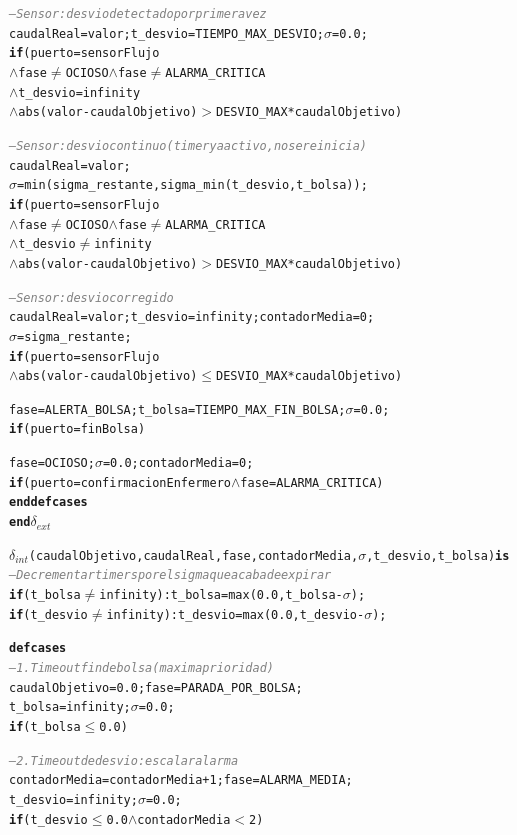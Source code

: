 \documentclass[12pt, a4paper]{article}
\newcommand{\cmlgt}{$>$}
\newcommand{\cmlle}{$\leq$}
\newcommand{\cmllt}{$<$}
\newcommand{\cmlwedge}{$\wedge$}
\newcommand{\cmlneq}{$\neq$}
\newcommand{\kw}[1]{\textbf{#1}}
\newcommand{\cmlsigma}{$\sigma$}
\newcommand{\dint}{$\delta_{\mathit{int}}$}
\newcommand{\dext}{$\delta_{\mathit{ext}}$}
\newcommand{\cmlcomment}[1]{\textit{\textcolor{gray}{#1}}}
\newenvironment{cmldevs}{%
  \begin{alltt}\small%
}{%
  \end{alltt}%
}
\begin{document}
\begin{center}
\begin{cmldevs}
        \cmlcomment{-- Sensor: desvio detectado por primera vez}
        caudalReal = valor; t\_desvio = TIEMPO\_MAX\_DESVIO; \cmlsigma{} = 0.0;
            \kw{if} (puerto = sensorFlujo
                \cmlwedge{} fase \cmlneq{} OCIOSO \cmlwedge{} fase \cmlneq{} ALARMA\_CRITICA
                \cmlwedge{} t\_desvio = infinity
                \cmlwedge{} abs(valor - caudalObjetivo) \cmlgt{} DESVIO\_MAX * caudalObjetivo)

        \cmlcomment{-- Sensor: desvio continuo (timer ya activo, no se reinicia)}
        caudalReal = valor;
        \cmlsigma{} = min(sigma\_restante, sigma\_min(t\_desvio, t\_bolsa));
            \kw{if} (puerto = sensorFlujo
                \cmlwedge{} fase \cmlneq{} OCIOSO \cmlwedge{} fase \cmlneq{} ALARMA\_CRITICA
                \cmlwedge{} t\_desvio \cmlneq{} infinity
                \cmlwedge{} abs(valor - caudalObjetivo) \cmlgt{} DESVIO\_MAX * caudalObjetivo)

        \cmlcomment{-- Sensor: desvio corregido}
        caudalReal = valor; t\_desvio = infinity; contadorMedia = 0;
        \cmlsigma{} = sigma\_restante;
            \kw{if} (puerto = sensorFlujo
                \cmlwedge{} abs(valor - caudalObjetivo) \cmlle{} DESVIO\_MAX * caudalObjetivo)

        fase = ALERTA\_BOLSA; t\_bolsa = TIEMPO\_MAX\_FIN\_BOLSA; \cmlsigma{} = 0.0;
            \kw{if} (puerto = finBolsa)

        fase = OCIOSO; \cmlsigma{} = 0.0; contadorMedia = 0;
            \kw{if} (puerto = confirmacionEnfermero \cmlwedge{} fase = ALARMA\_CRITICA)
    \kw{end defcases}
\kw{end} \dext{}

\dint{}(caudalObjetivo, caudalReal, fase, contadorMedia, \cmlsigma{}, t\_desvio, t\_bolsa) \kw{is}
    \cmlcomment{-- Decrementar timers por el sigma que acaba de expirar}
    \kw{if} (t\_bolsa  \cmlneq{} infinity): t\_bolsa  = max(0.0, t\_bolsa  - \cmlsigma{});
    \kw{if} (t\_desvio \cmlneq{} infinity): t\_desvio = max(0.0, t\_desvio - \cmlsigma{});

    \kw{defcases}
        \cmlcomment{-- 1. Timeout fin de bolsa (maxima prioridad)}
        caudalObjetivo = 0.0; fase = PARADA\_POR\_BOLSA;
        t\_bolsa = infinity; \cmlsigma{} = 0.0;
            \kw{if} (t\_bolsa \cmlle{} 0.0)

        \cmlcomment{-- 2. Timeout de desvio: escalar alarma}
        contadorMedia = contadorMedia + 1; fase = ALARMA\_MEDIA;
        t\_desvio = infinity; \cmlsigma{} = 0.0;
            \kw{if} (t\_desvio \cmlle{} 0.0 \cmlwedge{} contadorMedia \cmllt{} 2)


\end{cmldevs}
\end{center}
\end{document}
